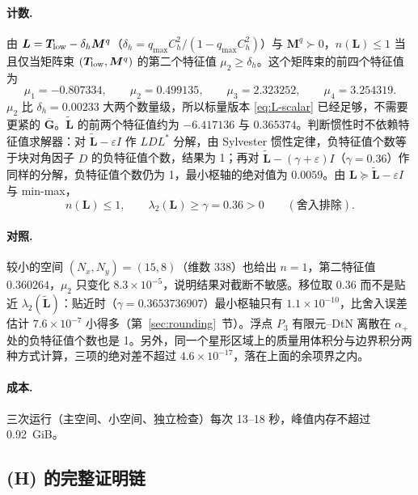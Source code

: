 \documentclass[11pt,a4paper,fontset=fandol]{ctexart}
\begin{document}
\paragraph{计数.} 由 $\bm L=\bm T_{\rm low}-\delta_h\bm M^q$（$\delta_h=q_{\max}C_h^2/(1-q_{\max}C_h^2)$）与 $\bm M^q\succ0$，$n(\bm L)\le1$ 当且仅当矩阵束 $(\bm T_{\rm low},\bm M^q)$ 的第二个特征值 $\mu_2\ge\delta_h$。这个矩阵束的前四个特征值为
\[
\mu_1=-0.807334,\qquad\mu_2=0.499135,\qquad\mu_3=2.323252,\qquad\mu_4=3.254319 .
\]
$\mu_2$ 比 $\delta_h=0.00233$ 大两个数量级，所以标量版本 \eqref{eq:L-scalar} 已经足够，不需要更紧的 $\overline{\bm G}$。$\tilde{\bm L}$ 的前两个特征值约为 $-6.417136$ 与 $0.365374$。判断惯性时不依赖特征值求解器：对 $\tilde{\bm L}-\varepsilon I$ 作 $LDL^*$ 分解，由 Sylvester 惯性定律，负特征值个数等于块对角因子 $D$ 的负特征值个数，结果为 1；再对 $\tilde{\bm L}-(\gamma+\varepsilon)I$（$\gamma=0.36$）作同样的分解，负特征值个数仍为 1，最小枢轴的绝对值为 $0.0059$。由 $\bm L\succeq\tilde{\bm L}-\varepsilon I$ 与 min-max，
\[
n(\bm L)\le1,\qquad\lambda_2(\bm L)\ge\gamma=0.36>0\qquad(\text{舍入排除}).
\]

\paragraph{对照.} 较小的空间 $(N_x,N_y)=(15,8)$（维数 338）也给出 $n=1$，第二特征值 $0.360264$，$\mu_2$ 只变化 $8.3\times10^{-5}$，说明结果对截断不敏感。移位取 $0.36$ 而不是贴近 $\lambda_2(\tilde{\bm L})$：贴近时（$\gamma=0.3653736907$）最小枢轴只有 $1.1\times10^{-10}$，比舍入误差估计 $7.6\times10^{-7}$ 小得多（第~\ref{sec:rounding}~节）。浮点 $P_3$ 有限元--DtN 离散在 $\alpha_+$ 处的负特征值个数也是 1。另外，同一个星形区域上的质量用体积分与边界积分两种方式计算，三项的绝对差不超过 $4.6\times10^{-17}$，落在上面的余项界之内。

\paragraph{成本.} 三次运行（主空间、小空间、独立检查）每次 13--18 秒，峰值内存不超过 0.92~GiB。

\subsection{(H) 的完整证明链}
\end{document}
